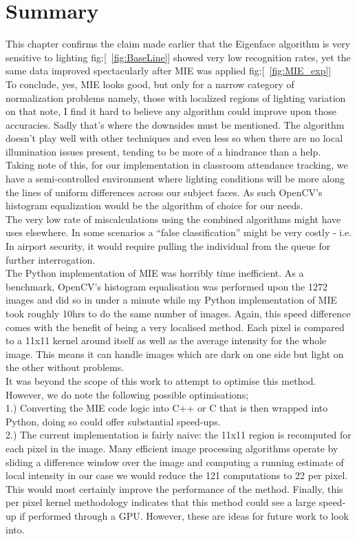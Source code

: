 \section{Summary}
This chapter confirms the claim made earlier that the Eigenface algorithm is very sensitive to lighting fig:[~\ref{fig:BaseLine}]
showed very low recognition rates, yet the same data improved spectacularly after MIE was applied fig:[~\ref{fig:MIE_exp}] \\

To conclude, yes, MIE looks good, but only for a narrow category of normalization problems namely, those with localized regions of 
lighting variation on that note, I find it hard to believe any algorithm could improve upon those accuracies.  Sadly that's where the 
downsides must be mentioned.  The algorithm doesn't play well with other techniques and even less so when there are no local 
illumination issues present, tending to be more of a hindrance than a help.  Taking note of this, for our implementation in classroom 
attendance tracking, we have a semi-controlled environment where lighting conditions will be more along the lines of uniform 
differences across our subject faces.  As such OpenCV's histogram equalization would be the algorithm of choice for our needs.  \\

The very low rate of miscalculations using the combined algorithms might have uses elsewhere.  In some scenarios a ``false classification'' 
might be very costly - i.e. In airport security, it would require pulling the individual from the queue for further interrogation. \\

The Python implementation of MIE was horribly time inefficient.  As a benchmark, OpenCV's histogram equalisation was performed 
upon the 1272 images and did so in under a minute while my Python implementation of MIE took roughly 10hrs to do the same number of images. 
Again, this speed difference comes with the benefit of being a very localised method.  Each pixel is compared to a 11x11 kernel 
around itself as well as the average intensity for the whole image.  This means it can handle images which are dark on one side but 
light on the other without problems. \\  

It was beyond the scope of this work to attempt to optimise this method. However, we do note the following possible optimisations; \\
1.) Converting the MIE code logic into C++ or C that is then wrapped into Python, doing so could offer substantial speed-ups. \\
2.) The current implementation is fairly naive: the 11x11 region is recomputed for each pixel in the image.  Many efficient image 
processing algorithms operate by sliding a difference window over the image and computing a running estimate of local intensity in 
our case we would reduce the 121 computations to 22 per pixel.  This would most certainly improve the performance of the method. 
Finally, this per pixel kernel methodology indicates that this method could see a large speed-up if performed through a GPU.  
However, these are ideas for future work to look into.




